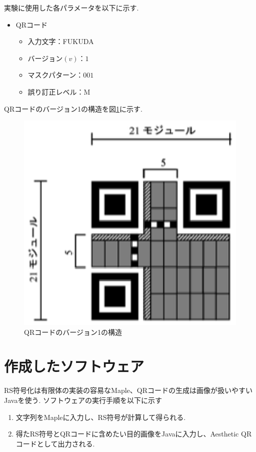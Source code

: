 \documentclass{thesis}
\begin{document}
実験に使用した各パラメータを以下に示す.

\begin{itemize}
\setlength{\itemsep}{5mm}
 \item QRコード
    \begin{itemize}
      \item 入力文字：FUKUDA
      \item バージョン$(v)$：$1$
      \item マスクパターン：$001$
      \item 誤り訂正レベル：M
     \end{itemize}
  \end{itemize}

QRコードのバージョン1の構造を図\ref{v1}に示す.

\begin{figure}[H]
      \centering
      \includegraphics[width=0.5\linewidth]{pic/v1.eps}
      \caption{QRコードのバージョン1の構造}
      \label{v1}
\end{figure}

\section{作成したソフトウェア}

RS符号化は有限体の実装の容易なMaple、QRコードの生成は画像が扱いやすいJavaを使う.
ソフトウェアの実行手順を以下に示す

\begin{enumerate}
\item
文字列をMapleに入力し、RS符号が計算して得られる.
\item
得たRS符号とQRコードに含めたい目的画像をJavaに入力し、Aesthetic QRコードとして出力される.

\end{enumerate}
\end{document}
